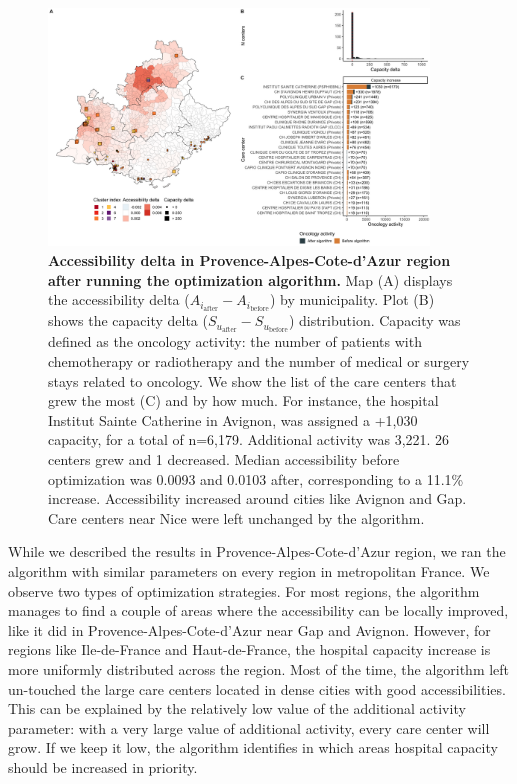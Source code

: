 \begin{figure}[H]
    \includegraphics[width=0.9\textwidth]{images/camion/fig5_Provence-Alpes-Cote-d'Azur.png}
    \centering
    \caption{ \textbf{Accessibility delta in Provence-Alpes-Cote-d'Azur region
        after running the optimization algorithm.} Map (A) displays the
    accessibility delta ($A_{i_\text{after}} - A_{i_\text{before}}$) by
    municipality. Plot (B) shows the capacity delta
    ($S_{u_\text{after}}-S_{u_\text{before}}$) distribution. Capacity was
    defined as the oncology activity: the number of patients with
    chemotherapy or radiotherapy and the number of medical or surgery stays
    related to oncology. We show the list of the care centers that grew the
    most (C)  and by how much. For instance, the hospital Institut Sainte
    Catherine in Avignon, was assigned a +1,030 capacity, for a total of
    n=6,179. Additional activity was 3,221. 26 centers grew and 1 decreased.
    Median accessibility before optimization was 0.0093 and 0.0103 after,
    corresponding to a 11.1\% increase.  Accessibility increased around
    cities like Avignon and Gap. Care centers near Nice were left unchanged
    by the algorithm. }
    \label{fig:optim-paca}
\end{figure}

While we described the results in Provence-Alpes-Cote-d'Azur region, we ran the
algorithm with similar parameters on every region in metropolitan France. We
observe two types of optimization strategies. For most regions, the algorithm
manages to find a couple of areas where the accessibility can be locally
improved, like it did in Provence-Alpes-Cote-d'Azur near Gap and Avignon.
However, for regions like Ile-de-France and Haut-de-France, the hospital
capacity increase is more uniformly distributed across the region. Most of the
time, the algorithm left un-touched the large care centers located in dense
cities with good accessibilities. This can be explained by the relatively low
value of the additional activity parameter: with a very large value of
additional activity, every care center will grow. If we keep it low, the
algorithm identifies in which areas hospital capacity should be increased in
priority.

